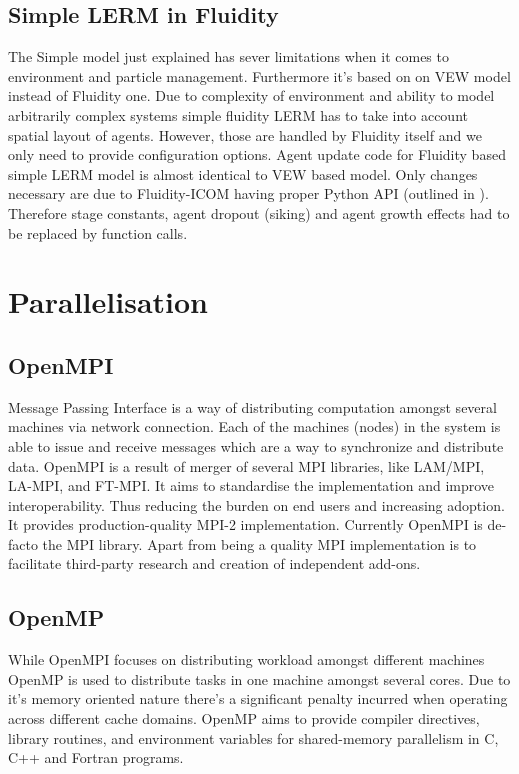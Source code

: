 \documentclass[12pt, a4paper]{report}
\begin{document}
\subsection{Simple LERM in Fluidity}\label{subsec:lerm-simp-fluid}
The Simple model just explained has sever limitations when it comes
to environment and particle management. Furthermore it's based on
on VEW model instead of Fluidity one. Due to complexity of environment
and ability to model arbitrarily complex systems simple fluidity
LERM has to take into account spatial layout of agents. However,
those are handled by Fluidity itself and we only need to provide
configuration options. Agent update code for Fluidity based simple
LERM model is almost identical to VEW based model. Only changes
necessary are due to Fluidity-ICOM having proper Python API (outlined
in \cite{FluidityVEW}). Therefore stage constants, agent dropout (siking)
and agent growth effects had to be replaced by function calls.


\section{Parallelisation}\label{sec:para}

\subsection{OpenMPI}\label{subsec:openmpi}
Message Passing Interface is a way of distributing computation
amongst several machines via network connection. Each of the
machines (nodes) in the system is able to issue and receive
messages which are a way to synchronize and distribute data.
OpenMPI \cite{gabriel04:_open_mpi} is a result of merger of several MPI libraries, like
LAM/MPI, LA-MPI, and FT-MPI. It aims to standardise the implementation
and improve interoperability. Thus reducing the burden on
end users and increasing adoption. It provides production-quality
MPI-2 implementation. Currently OpenMPI is de-facto the MPI
library. Apart from being a quality MPI implementation is to
facilitate third-party research and creation of independent
add-ons.

\subsection{OpenMP}\label{subsec:openmp}
While OpenMPI focuses on distributing workload amongst different
machines OpenMP \cite{OpenMP4.0} is used to distribute tasks in one machine amongst
several cores. Due to it's memory oriented nature there's a significant
penalty incurred when operating across different cache domains.
OpenMP aims to provide compiler directives, library routines, and environment variables
for shared-memory parallelism in C, C++ and Fortran programs.
\end{document}
